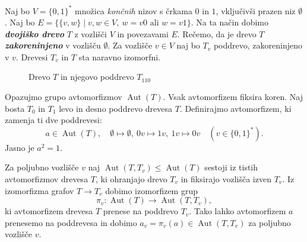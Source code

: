 \documentclass[11pt]{book}
\def\prenos{\pi}
\DeclareMathOperator\Aut{Aut}
\def\definicija{\color{rdeca}\bf\em}
\theoremstyle{definition}
\theoremstyle{zgled}
\theoremstyle{odprtproblem}
\theoremstyle{domacanaloga}
\theoremstyle{izrek}
\begin{document}
Naj bo $V = \{ 0, 1 \}^*$ množica {\em končnih} nizov s črkama $0$ in $1$, vključivši prazen niz $\emptyset$. Naj bo $E = \{ \{ v, w \} \mid v,w \in V, \ \text{$w = v0$ ali $w = v1$} \}$. Na ta način dobimo {\definicija dvojiško drevo} $T$ z vozlišči $V$ in povezavami $E$. Rečemo, da je drevo $T$ {\definicija zakoreninjeno} v vozlišču $\emptyset$. Za vozlišče $v \in V$ naj bo $T_v$ poddrevo, zakoreninjeno v $v$. Drevesi $T_v$ in $T$ sta naravno izomorfni.

\begin{figure}[t]
\centering
{}
\caption{Drevo $T$ in njegovo poddrevo $T_{110}$}
\end{figure}

Opazujmo grupo avtomorfizmov $\Aut(T)$. Vsak avtomorfizem fiksira koren. Naj bosta $T_0$ in $T_1$ levo in desno poddrevo drevesa $T$. Definirajmo avtomorfizem, ki zamenja ti dve poddrevesi:
\[
a \in \Aut(T), \quad 
\emptyset \mapsto \emptyset, \ 0v \mapsto 1v, \ 1v \mapsto 0v \quad (v \in \{0,1\}^*).
\]
Jasno je $a^2 = 1$. 

Za poljubno vozlišče $v$ naj $\Aut(T, T_v) \leq \Aut(T)$ sestoji iz tistih avtomorfizmov drevesa $T$, ki ohranjajo drevo $T_v$ in fiksirajo vozlišča izven $T_v$. Iz izomorfizma grafov $T \to T_v$ dobimo izomorfizem grup
\[
\prenos_v \colon \Aut(T) \to \Aut(T,T_v),
\]
ki avtomorfizem drevesa $T$ prenese na poddrevo $T_v$. Tako lahko avtomorfizem $a$ prenesemo na poddrevesa in dobimo $a_v = \prenos_v(a) \in \Aut(T,T_v)$ za poljubno vozlišče $v$.
\end{document}
